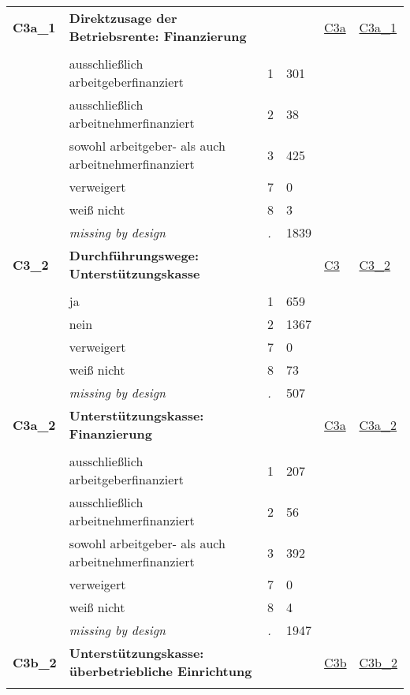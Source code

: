 \begin{longtable}{| L{2.45cm} | L{6cm} | C{1.5cm} | R{1cm} | C{2.25cm} | C{2.25cm} |}
   \midrule
\textbf{C3a\_1}\label{var:C3a:1} & \textbf{Direktzusage der Betriebsrente: Finanzierung} &  &  & \hyperref[C3a]{C3a} & \hyperref[var:suf:C3a:1]{C3a\_1} \\ 
   &  &  &  &  &  \\ 
   & ausschließlich arbeitgeberfinanziert & 1 & 301 &  &  \\ 
   & ausschließlich arbeitnehmerfinanziert & 2 & 38 &  &  \\ 
   & sowohl arbeitgeber- als auch arbeitnehmerfinanziert & 3 & 425 &  &  \\ 
   & verweigert & 7 & 0 &  &  \\ 
   & weiß nicht & 8 & 3 &  &  \\ 
   & \textit{missing by design} & \textit{.} & 1839 &  &  \\ 
   \midrule
\textbf{C3\_2}\label{var:C3:2} & \textbf{Durchführungswege: Unterstützungskasse} &  &  & \hyperref[C3]{C3} & \hyperref[var:suf:C3:2]{C3\_2} \\ 
   &  &  &  &  &  \\ 
   & ja & 1 & 659 &  &  \\ 
   & nein & 2 & 1367 &  &  \\ 
   & verweigert & 7 & 0 &  &  \\ 
   & weiß nicht & 8 & 73 &  &  \\ 
   & \textit{missing by design} & \textit{.} & 507 &  &  \\ 
   \midrule
\textbf{C3a\_2}\label{var:C3a:2} & \textbf{Unterstützungskasse: Finanzierung} &  &  & \hyperref[C3a]{C3a} & \hyperref[var:suf:C3a:2]{C3a\_2} \\ 
   &  &  &  &  &  \\ 
   & ausschließlich arbeitgeberfinanziert & 1 & 207 &  &  \\ 
   & ausschließlich arbeitnehmerfinanziert & 2 & 56 &  &  \\ 
   & sowohl arbeitgeber- als auch arbeitnehmerfinanziert & 3 & 392 &  &  \\ 
   & verweigert & 7 & 0 &  &  \\ 
   & weiß nicht & 8 & 4 &  &  \\ 
   & \textit{missing by design} & \textit{.} & 1947 &  &  \\ 
   \midrule
\textbf{C3b\_2}\label{var:C3b:2} & \textbf{Unterstützungskasse: überbetriebliche Einrichtung} &  &  & \hyperref[C3b]{C3b} & \hyperref[var:suf:C3b:2]{C3b\_2} \\ 
   &  &  &  &  &  \\ 

\end{longtable}
